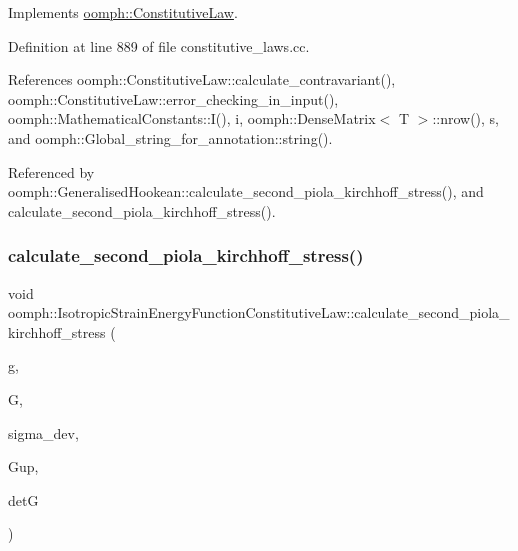 Implements \hyperlink{classoomph_1_1ConstitutiveLaw_a93527d910de908035feb8f41b0401065}{oomph\+::\+Constitutive\+Law}.



Definition at line 889 of file constitutive\+\_\+laws.\+cc.



References oomph\+::\+Constitutive\+Law\+::calculate\+\_\+contravariant(), oomph\+::\+Constitutive\+Law\+::error\+\_\+checking\+\_\+in\+\_\+input(), oomph\+::\+Mathematical\+Constants\+::\+I(), i, oomph\+::\+Dense\+Matrix$<$ T $>$\+::nrow(), s, and oomph\+::\+Global\+\_\+string\+\_\+for\+\_\+annotation\+::string().



Referenced by oomph\+::\+Generalised\+Hookean\+::calculate\+\_\+second\+\_\+piola\+\_\+kirchhoff\+\_\+stress(), and calculate\+\_\+second\+\_\+piola\+\_\+kirchhoff\+\_\+stress().

\mbox{\label{classoomph_1_1IsotropicStrainEnergyFunctionConstitutiveLaw_acf61673ecc4f960fee908378ac48544a}} 
\subsubsection{\texorpdfstring{calculate\+\_\+second\+\_\+piola\+\_\+kirchhoff\+\_\+stress()}{calculate\_second\_piola\_kirchhoff\_stress()}\hspace{0.1cm}{\footnotesize\ttfamily [2/3]}}
{\footnotesize\ttfamily void oomph\+::\+Isotropic\+Strain\+Energy\+Function\+Constitutive\+Law\+::calculate\+\_\+second\+\_\+piola\+\_\+kirchhoff\+\_\+stress (\begin{DoxyParamCaption}\item[{const \hyperlink{classoomph_1_1DenseMatrix}{Dense\+Matrix}$<$ double $>$ \&}]{g,  }\item[{const \hyperlink{classoomph_1_1DenseMatrix}{Dense\+Matrix}$<$ double $>$ \&}]{G,  }\item[{\hyperlink{classoomph_1_1DenseMatrix}{Dense\+Matrix}$<$ double $>$ \&}]{sigma\+\_\+dev,  }\item[{\hyperlink{classoomph_1_1DenseMatrix}{Dense\+Matrix}$<$ double $>$ \&}]{Gup,  }\item[{double \&}]{detG }\end{DoxyParamCaption})\hspace{0.3cm}{\ttfamily [virtual]}}



